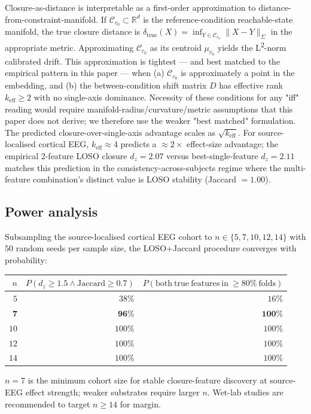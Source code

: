 \documentclass[11pt,a4paper]{article}
\begin{document}
Closure-as-distance is interpretable as a first-order approximation to distance-from-constraint-manifold. If $\mathcal{C}_{c_0} \subset \mathbb{R}^d$ is the reference-condition reachable-state manifold, the true closure distance is $\delta_{\mathrm{true}}(X) = \inf_{Y \in \mathcal{C}_{c_0}} \|X - Y\|_{\Sigma}$ in the appropriate metric. Approximating $\mathcal{C}_{c_0}$ as its centroid $\mu_{c_0}$ yields the L\textsuperscript{2}-norm calibrated drift. This approximation is tightest --- and best matched to the empirical pattern in this paper --- when (a) $\mathcal{C}_{c_0}$ is approximately a point in the embedding, and (b) the between-condition shift matrix $D$ has effective rank $k_{\mathrm{eff}} \geq 2$ with no single-axis dominance. Necessity of these conditions for any "iff" reading would require manifold-radius/curvature/metric assumptions that this paper does not derive; we therefore use the weaker "best matched" formulation. The predicted closure-over-single-axis advantage scales as $\sqrt{k_{\mathrm{eff}}}$. For source-localised cortical EEG, $k_{\mathrm{eff}} \approx 4$ predicts a $\approx 2\times$ effect-size advantage; the empirical 2-feature LOSO closure $d_z = 2.07$ versus best-single-feature $d_z = 2.11$ matches this prediction in the consistency-across-subjects regime where the multi-feature combination's distinct value is LOSO stability (Jaccard $= 1.00$).

\subsection{Power analysis}\label{sec:method-power}

Subsampling the source-localised cortical EEG cohort to $n \in \{5, 7, 10, 12, 14\}$ with $50$ random seeds per sample size, the LOSO+Jaccard procedure converges with probability:
\begin{center}
\begin{tabular}{rrr}\toprule
$n$ & $P(d_z \geq 1.5 \wedge \mathrm{Jaccard} \geq 0.7)$ & $P(\mathrm{both\ true\ features\ in\ }\geq 80\%\ \mathrm{folds})$ \\
\midrule
$5$  & $38\%$  & $16\%$ \\
$\mathbf{7}$  & $\mathbf{96\%}$  & $\mathbf{100\%}$ \\
$10$ & $100\%$ & $100\%$ \\
$12$ & $100\%$ & $100\%$ \\
$14$ & $100\%$ & $100\%$ \\
\bottomrule\end{tabular}
\end{center}
$n = 7$ is the minimum cohort size for stable closure-feature discovery at source-EEG effect strength; weaker substrates require larger $n$. Wet-lab studies are recommended to target $n \geq 14$ for margin.
\end{document}
